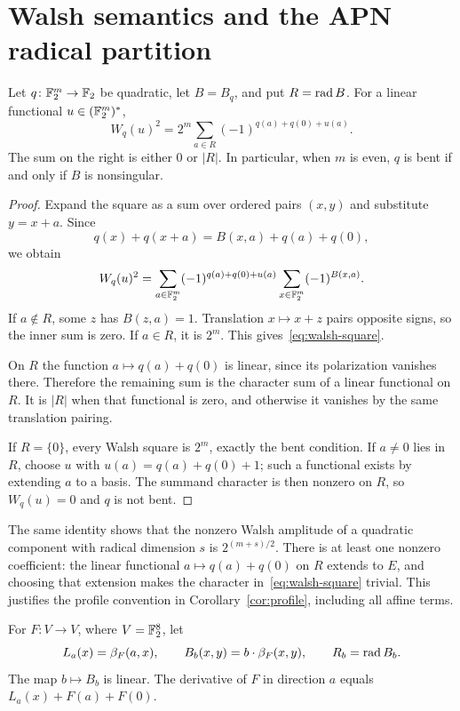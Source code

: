 \section{Walsh semantics and the APN radical partition}\label{sec:apn}
\begin{lemma}\label{lem:walsh}
Let $q\colon\mathbb F_2^m\to\mathbb F_2$ be quadratic, let $B=B_q$, and put $R=\operatorname{rad} B$. For a linear functional $u\in(\mathbb F_2^m)^*$,
\begin{equation}\label{eq:walsh-square}
W_q(u)^2=2^m\sum_{a\in R}(-1)^{q(a)+q(0)+u(a)}.
\end{equation}
The sum on the right is either $0$ or $|R|$. In particular, when $m$ is even, $q$ is bent if and only if $B$ is nonsingular.
\end{lemma}
\begin{proof}
Expand the square as a sum over ordered pairs $(x,y)$ and substitute $y=x+a$. Since
\[
q(x)+q(x+a)=B(x,a)+q(a)+q(0),
\]
we obtain
\[
W_q(u)^2=
\sum_{a\in\mathbb F_2^m}(-1)^{q(a)+q(0)+u(a)}
\sum_{x\in\mathbb F_2^m}(-1)^{B(x,a)}.
\]
If $a\notin R$, some $z$ has $B(z,a)=1$. Translation $x\mapsto x+z$ pairs opposite signs, so the inner sum is zero. If $a\in R$, it is $2^m$. This gives~\eqref{eq:walsh-square}.

On $R$ the function $a\mapsto q(a)+q(0)$ is linear, since its polarization vanishes there. Therefore the remaining sum is the character sum of a linear functional on $R$. It is $|R|$ when that functional is zero, and otherwise it vanishes by the same translation pairing.

If $R=\{0\}$, every Walsh square is $2^m$, exactly the bent condition. If $a\ne0$ lies in $R$, choose $u$ with $u(a)=q(a)+q(0)+1$; such a functional exists by extending $a$ to a basis. The summand character is then nonzero on $R$, so $W_q(u)=0$ and $q$ is not bent.
\end{proof}

The same identity shows that the nonzero Walsh amplitude of a quadratic component with radical dimension $s$ is $2^{(m+s)/2}$. There is at least one nonzero coefficient: the linear functional $a\mapsto q(a)+q(0)$ on $R$ extends to $E$, and choosing that extension makes the character in~\eqref{eq:walsh-square} trivial. This justifies the profile convention in Corollary~\ref{cor:profile}, including all affine terms.

For $F\colon V\to V$, where $V=\mathbb F_2^8$, let
\[
L_a(x)=\beta_F(a,x),\qquad B_b(x,y)=b\cdot\beta_F(x,y),
\qquad R_b=\operatorname{rad} B_b.
\]
The map $b\mapsto B_b$ is linear. The derivative of $F$ in direction $a$ equals $L_a(x)+F(a)+F(0)$.

